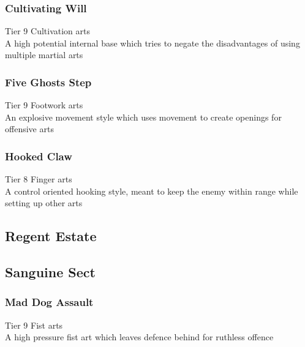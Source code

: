 \subsubsection{Cultivating Will}
Tier 9 Cultivation arts\\
A high potential internal base which tries to negate the disadvantages of using multiple martial arts

\subsubsection{Five Ghosts Step}
Tier 9 Footwork arts\\
An explosive movement style which uses movement to create openings for offensive arts

\subsubsection{Hooked Claw}
Tier 8 Finger arts\\
A control oriented hooking style, meant to keep the enemy within range while setting up other arts

\subsection{Regent Estate} %
\subsubsection{}

\subsubsection{}

\subsubsection{}

\subsection{Sanguine Sect}
\subsubsection{Mad Dog Assault}
Tier 9 Fist arts\\
A high pressure fist art which leaves defence behind for ruthless offence

